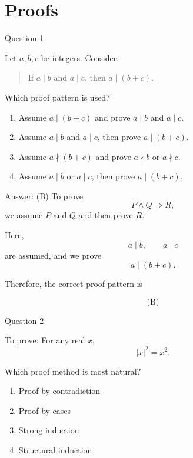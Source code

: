 \documentclass[aspectratio=169,11pt]{beamer}
\begin{document}
\section{Proofs}
\begin{frame}{Question 1}

Let $a,b,c$ be integers. Consider:

\begin{quote}
If $a\mid b$ and $a\mid c$, then $a\mid(b+c)$.
\end{quote}

Which proof pattern is used?

\begin{enumerate}
    \item[(A)] Assume $a\mid(b+c)$ and prove $a\mid b$ and $a\mid c$.
    \item[(B)] Assume $a\mid b$ and $a\mid c$, then prove $a\mid(b+c)$.
    \item[(C)] Assume $a\nmid(b+c)$ and prove $a\nmid b$ or $a\nmid c$.
    \item[(D)] Assume $a\mid b$ or $a\mid c$, then prove $a\mid(b+c)$.
\end{enumerate}

\end{frame}

\begin{frame}

\begin{block}{Answer: (B)}
To prove
$$
P\land Q\Rightarrow R,
$$
we assume $P$ and $Q$ and then prove $R$.

Here,
$$
a\mid b,\qquad a\mid c
$$
are assumed, and we prove
$$
a\mid(b+c).
$$

Therefore, the correct proof pattern is

$$
\boxed{\text{(B)}}
$$
\end{block}

\end{frame}

\begin{frame}{Question 2}

To prove: For any real $x$,
$$
|x|^2=x^2.
$$

Which proof method is most natural?

\begin{enumerate}
    \item[(A)] Proof by contradiction
    \item[(B)] Proof by cases
    \item[(C)] Strong induction
    \item[(D)] Structural induction
\end{enumerate}

\end{frame}
\end{document}
